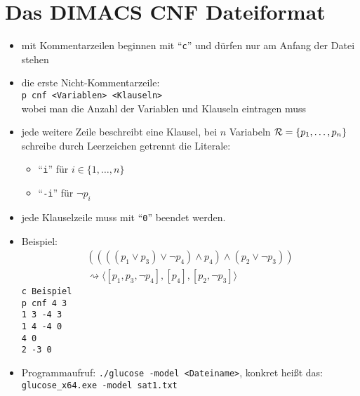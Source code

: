 
\section{Das DIMACS CNF Dateiformat}
\begin{itemize}
	\item mit Kommentarzeilen beginnen mit ``\texttt{c}'' und dürfen nur am Anfang der Datei stehen
	\item die erste Nicht-Kommentarzeile:\\ \texttt{p cnf <Variablen> <Klauseln>}\\ wobei man die Anzahl der Variablen und Klauseln eintragen muss
	\item jede weitere Zeile beschreibt eine Klausel, bei $n$ Variabeln $\mathcal{R}=\lbrace p_1,\ldots, p_n\rbrace$ schreibe durch Leerzeichen getrennt die Literale:
	\begin{itemize}
		\item ``\texttt{i}'' für $i\in\lbrace1,\ldots, n\rbrace$
		\item ``\texttt{-i}'' für $\neg p_i$
	\end{itemize}
	\item jede Klauselzeile muss mit ``\texttt{0}'' beendet werden.
	\item Beispiel:
	\begin{align*}
		(((( p_1\vee p_3)\vee\neg p_4)\wedge p_4)\wedge (p_2\vee\neg p_3))\\
		\rightsquigarrow
		\big\langle [p_1, p_3,\neg p_4],[p_4],[p_2,\neg p_3]\big\rangle
	\end{align*}
	\texttt{c Beispiel\\
		p cnf 4 3\\
		1 3 -4 3\\
		1 4 -4 0\\
		4 0\\
		2 -3 0}
	\item Programmaufruf: \texttt{./glucose -model <Dateiname>}, konkret heißt das:\\
	\texttt{glucose\_x64.exe -model sat1.txt}
\end{itemize}

